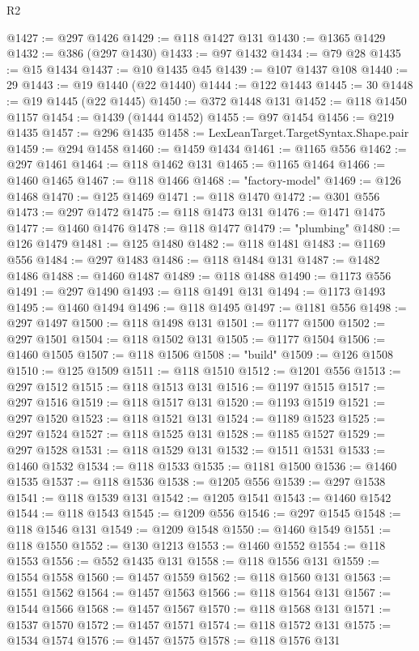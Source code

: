 \begin{lexlean}{R2}
\begin{coremodule}
@1427 := @297 @1426
@1429 := @118 @1427 @131
@1430 := @1365 @1429
@1432 := @386 (@297 @1430)
@1433 := @97 @1432
@1434 := @79 @28
@1435 := @15 @1434
@1437 := @10 @1435 @45
@1439 := @107 @1437 @108
@1440 := 29
@1443 := @19 @1440 (@22 @1440)
@1444 := @122 @1443
@1445 := 30
@1448 := @19 @1445 (@22 @1445)
@1450 := @372 @1448 @131
@1452 := @118 @1450 @1157
@1454 := @1439 (@1444 @1452)
@1455 := @97 @1454
@1456 := @219 @1435
@1457 := @296 @1435
@1458 := LexLeanTarget.TargetSyntax.Shape.pair
@1459 := @294 @1458
@1460 := @1459 @1434
@1461 := @1165 @556
@1462 := @297 @1461
@1464 := @118 @1462 @131
@1465 := @1165 @1464
@1466 := @1460 @1465
@1467 := @118 @1466
@1468 := "factory-model"
@1469 := @126 @1468
@1470 := @125 @1469
@1471 := @118 @1470
@1472 := @301 @556
@1473 := @297 @1472
@1475 := @118 @1473 @131
@1476 := @1471 @1475
@1477 := @1460 @1476
@1478 := @118 @1477
@1479 := "plumbing"
@1480 := @126 @1479
@1481 := @125 @1480
@1482 := @118 @1481
@1483 := @1169 @556
@1484 := @297 @1483
@1486 := @118 @1484 @131
@1487 := @1482 @1486
@1488 := @1460 @1487
@1489 := @118 @1488
@1490 := @1173 @556
@1491 := @297 @1490
@1493 := @118 @1491 @131
@1494 := @1173 @1493
@1495 := @1460 @1494
@1496 := @118 @1495
@1497 := @1181 @556
@1498 := @297 @1497
@1500 := @118 @1498 @131
@1501 := @1177 @1500
@1502 := @297 @1501
@1504 := @118 @1502 @131
@1505 := @1177 @1504
@1506 := @1460 @1505
@1507 := @118 @1506
@1508 := "build"
@1509 := @126 @1508
@1510 := @125 @1509
@1511 := @118 @1510
@1512 := @1201 @556
@1513 := @297 @1512
@1515 := @118 @1513 @131
@1516 := @1197 @1515
@1517 := @297 @1516
@1519 := @118 @1517 @131
@1520 := @1193 @1519
@1521 := @297 @1520
@1523 := @118 @1521 @131
@1524 := @1189 @1523
@1525 := @297 @1524
@1527 := @118 @1525 @131
@1528 := @1185 @1527
@1529 := @297 @1528
@1531 := @118 @1529 @131
@1532 := @1511 @1531
@1533 := @1460 @1532
@1534 := @118 @1533
@1535 := @1181 @1500
@1536 := @1460 @1535
@1537 := @118 @1536
@1538 := @1205 @556
@1539 := @297 @1538
@1541 := @118 @1539 @131
@1542 := @1205 @1541
@1543 := @1460 @1542
@1544 := @118 @1543
@1545 := @1209 @556
@1546 := @297 @1545
@1548 := @118 @1546 @131
@1549 := @1209 @1548
@1550 := @1460 @1549
@1551 := @118 @1550
@1552 := @130 @1213
@1553 := @1460 @1552
@1554 := @118 @1553
@1556 := @552 @1435 @131
@1558 := @118 @1556 @131
@1559 := @1554 @1558
@1560 := @1457 @1559
@1562 := @118 @1560 @131
@1563 := @1551 @1562
@1564 := @1457 @1563
@1566 := @118 @1564 @131
@1567 := @1544 @1566
@1568 := @1457 @1567
@1570 := @118 @1568 @131
@1571 := @1537 @1570
@1572 := @1457 @1571
@1574 := @118 @1572 @131
@1575 := @1534 @1574
@1576 := @1457 @1575
@1578 := @118 @1576 @131

\end{coremodule}
\end{lexlean}
